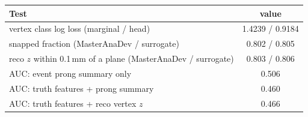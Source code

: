 \begin{tabular}{lc}
\toprule
Test & value \\
\midrule
vertex class log loss (marginal / head) & 1.4239 / 0.9184 \\
snapped fraction (MasterAnaDev / surrogate) & 0.802 / 0.805 \\
reco $z$ within 0.1\,mm of a plane (MasterAnaDev / surrogate) & 0.803 / 0.806 \\
\midrule
AUC: event prong summary only & 0.506 \\
AUC: truth features + prong summary & 0.460 \\
AUC: truth features + reco vertex $z$ & 0.466 \\
\bottomrule
\end{tabular}
